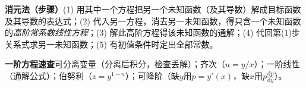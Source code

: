 \noindent\textbf{消元法（步骤）}\quad (1) 用其中一个方程把另一个未知函数（及其导数）解成目标函数及其导数的表达式；(2) 代入另一方程，消去另一未知函数，得只含一个未知函数的\emph{高阶常系数线性方程}；(3) 解此高阶方程得该未知函数的通解；(4) 代回第(1)步关系式求另一未知函数；(5) 有初值条件时定出全部常数。


\vspace{4pt}
\noindent\textbf{一阶方程速查}\quad 可分离变量（分离后积分，检查丢解）；齐次（$u=y/x$）；一阶线性（通解公式）；伯努利（$z=y^{1-n}$）；可降阶（缺$y$用$p=y'(x)$，缺$x$用$p\frac{\mathrm{d}p}{\mathrm{d}y}$）。
